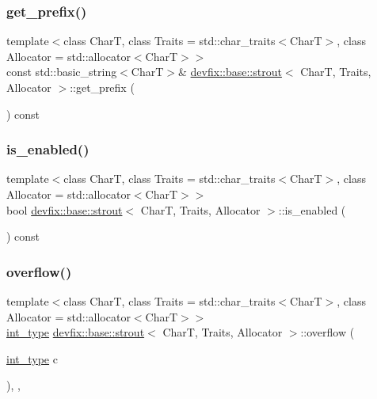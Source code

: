 \subsubsection{\texorpdfstring{get\+\_\+prefix()}{get\_prefix()}}
{\footnotesize\ttfamily template$<$class CharT, class Traits = std\+::char\+\_\+traits$<$\+Char\+T$>$, class Allocator = std\+::allocator$<$\+Char\+T$>$$>$ \\
const std\+::basic\+\_\+string$<$CharT$>$\& \hyperlink{structdevfix_1_1base_1_1strout}{devfix\+::base\+::strout}$<$ CharT, Traits, Allocator $>$\+::get\+\_\+prefix (\begin{DoxyParamCaption}{ }\end{DoxyParamCaption}) const\hspace{0.3cm}{\ttfamily [inline]}}

\mbox{\label{structdevfix_1_1base_1_1strout_a62b7808c3d8b54dd926bdecabea7cbd2}} 
\subsubsection{\texorpdfstring{is\+\_\+enabled()}{is\_enabled()}}
{\footnotesize\ttfamily template$<$class CharT, class Traits = std\+::char\+\_\+traits$<$\+Char\+T$>$, class Allocator = std\+::allocator$<$\+Char\+T$>$$>$ \\
bool \hyperlink{structdevfix_1_1base_1_1strout}{devfix\+::base\+::strout}$<$ CharT, Traits, Allocator $>$\+::is\+\_\+enabled (\begin{DoxyParamCaption}{ }\end{DoxyParamCaption}) const\hspace{0.3cm}{\ttfamily [inline]}}

\mbox{\label{structdevfix_1_1base_1_1strout_a1d8ba6e5c7c0c2d5558095d957cc4273}} 
\subsubsection{\texorpdfstring{overflow()}{overflow()}}
{\footnotesize\ttfamily template$<$class CharT, class Traits = std\+::char\+\_\+traits$<$\+Char\+T$>$, class Allocator = std\+::allocator$<$\+Char\+T$>$$>$ \\
\hyperlink{structdevfix_1_1base_1_1strout_ac08d70e3105ac2175c26e34818624826}{int\+\_\+type} \hyperlink{structdevfix_1_1base_1_1strout}{devfix\+::base\+::strout}$<$ CharT, Traits, Allocator $>$\+::overflow (\begin{DoxyParamCaption}\item[{\hyperlink{structdevfix_1_1base_1_1strout_ac08d70e3105ac2175c26e34818624826}{int\+\_\+type}}]{c }\end{DoxyParamCaption})\hspace{0.3cm}{\ttfamily [inline]}, {\ttfamily [override]}, {\ttfamily [protected]}}

